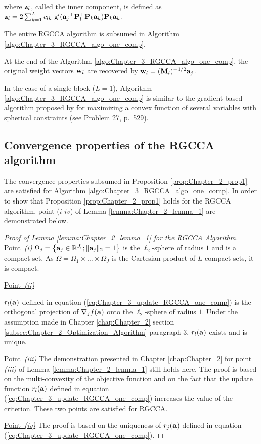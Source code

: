 \documentclass[
]{jss}
\begin{document}
where \(\mathbf{z}_l\), called the inner component, is defined as
\(\mathbf{z}_l = 2\sum_{\substack{k=1}}^{L}c_{lk} \text{ g}'({\mathbf{a}_j}^\top\mathbf{P}_l^\top\mathbf{P}_k\mathbf{a}_k)\mathbf{P}_k\mathbf{a}_k\).

The entire RGCCA algorithm is subsumed in Algorithm
\ref{algo:Chapter_3_RGCCA_algo_one_comp}.

At the end of the Algorithm \ref{algo:Chapter_3_RGCCA_algo_one_comp},
the original weight vectors \(\mathbf{w}_l\) are recovered by
\(\mathbf{w}_l = (\mathbf{M}_l)^{-1/2} \mathbf{a}_j\).

In the case of a single block (\(L=1\)), Algorithm
\ref{algo:Chapter_3_RGCCA_algo_one_comp} is similar to the
gradient-based algorithm proposed by \citep{Journee2010} for maximizing
a convex function of several variables with spherical constraints (see
Problem 27, p.~529).

\hypertarget{convergence-properties-of-the-rgcca-algorithm}{%
\subsection{Convergence properties of the RGCCA
algorithm}\label{convergence-properties-of-the-rgcca-algorithm}}

The convergence properties subsumed in Proposition
\ref{prop:Chapter_2_prop1} are satisfied for Algorithm
\ref{algo:Chapter_3_RGCCA_algo_one_comp}. In order to show that
Proposition \ref{prop:Chapter_2_prop1} holds for the RGCCA algorithm,
point (\(i\)-\(iv\)) of Lemma \ref{lemma:Chapter_2_lemma_1} are
demonstrated below.

\begin{proof}[Proof of Lemma \ref{lemma:Chapter_2_lemma_1} for the RGCCA Algorithm]

    \underline{Point~\textit{(i)}} $\Omega_j =\left\lbrace \mathbf{a}_j \in \mathbb{R}^{J_l}; \Vert \mathbf{a}_j \Vert_2 = 1 \right\rbrace$ is the $\ell_2$-sphere of radius $1$ and is a compact set.  As $\Omega = \Omega_1\times \ldots \times\Omega_J$ is the Cartesian product of $L$ compact sets, it is compact.

    \underline{Point~\textit{(ii)}} 

    $r_l(\mathbf{a})$ defined in equation (\ref{eq:Chapter_3_update_RGCCA_one_comp}) is the orthogonal projection of $\nabla_j f(\mathbf{a})$ onto the $\ell_2$-sphere of radius $1$. Under the assumption made in Chapter \ref{chap:Chapter_2} section \ref{subsec:Chapter_2_Optimization_Algorithm} paragraph $3$, $r_l(\mathbf{a})$ exists and is unique.

\underline{Point~\textit{(iii)}} The demonstration presented in Chapter \ref{chap:Chapter_2} for point \textit{(iii)} of Lemma \ref{lemma:Chapter_2_lemma_1} still holds here.
    The proof is based on the multi-convexity of the objective function and on the fact that the update function $r_l(\mathbf{a})$ defined in equation (\ref{eq:Chapter_3_update_RGCCA_one_comp}) increases the value of the criterion. These two points are satisfied for RGCCA.

    \underline{Point~\textit{(iv)}} The proof is based on the uniqueness of $r_j(\mathbf{a})$ defined in equation (\ref{eq:Chapter_3_update_RGCCA_one_comp}).

\end{proof}
\end{document}
